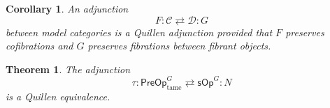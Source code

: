\documentclass[a4paper,10pt
,draft
]{article}%
\numberwithin{equation}{section}
\numberwithin{figure}{section}
\newtheorem{theorem}[equation]{Theorem}%
\newtheorem{corollary}[equation]{Corollary}%
\theoremstyle{definition} %
\newcommand{\1}{\ensuremath{\mathbbm 1}}%
\begin{document}


\begin{corollary}\label{SIMPLQUILL COR}
	An adjunction 
\[
	F \colon \mathcal{C}
	\rightleftarrows
	\mathcal{D} \colon G
\]
	between model categories is a Quillen adjunction
	provided that $F$ preserves cofibrations
	and $G$ preserves fibrations between fibrant objects.
\end{corollary}



\begin{theorem}\label{PREQUIEQUIV THM}
	The adjunction
\begin{equation}\label{PREQUIEQUIV EQ}
	\tau \colon \mathsf{PreOp}^G_{\text{tame}}
	\rightleftarrows 
	\mathsf{sOp}^G \colon N
\end{equation}
	is a Quillen equivalence.
\end{theorem}
\end{document}
